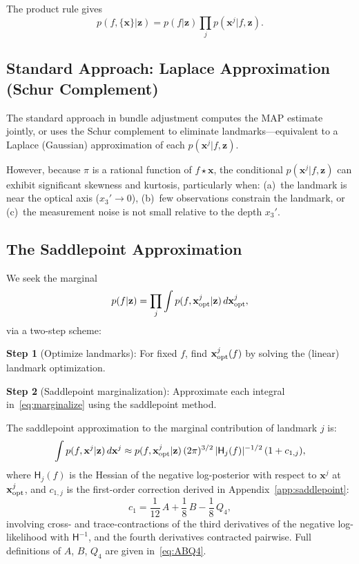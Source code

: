\documentclass[journal]{IEEEtran}
\newcommand{\beq}{\begin{equation}}
\newcommand{\eeq}{\end{equation}}
\begin{document}
The product rule gives
\beq
    p(f, \{\mathbf{x}\} | \mathbf{z}) = 
    p(f | \mathbf{z}) \prod_j p(\mathbf{x}^j | f, \mathbf{z}).
    \label{eq:productrule}
\eeq

\subsection{Standard Approach: Laplace Approximation (Schur Complement)}

The standard approach in bundle adjustment computes 
the MAP estimate jointly, or uses the Schur complement 
to eliminate landmarks---equivalent to a Laplace 
(Gaussian) approximation of each $p(\mathbf{x}^j | f, \mathbf{z})$.

However, because $\pi$ is a rational function of $f \star \mathbf{x}$, 
the conditional $p(\mathbf{x}^j | f, \mathbf{z})$ can exhibit 
significant skewness and kurtosis, particularly when:
(a)~the landmark is near the optical axis ($x_3' \to 0$),
(b)~few observations constrain the landmark, or
(c)~the measurement noise is not small relative to the 
depth $x_3'$.

\subsection{The Saddlepoint Approximation}

We seek the marginal
\beq
    p(f | \mathbf{z}) = \prod_j \int 
    p(f, \mathbf{x}^j_{\rm opt} | \mathbf{z})\, 
    d\mathbf{x}^j_{\rm opt},
    \label{eq:marginalize}
\eeq
via a two-step scheme:

\textbf{Step 1} (Optimize landmarks): For fixed $f$, 
find $\mathbf{x}^j_{\rm opt}(f)$ by solving the 
(linear) landmark optimization.

\textbf{Step 2} (Saddlepoint marginalization): 
Approximate each integral in~\eqref{eq:marginalize} 
using the saddlepoint method.

The saddlepoint approximation to the marginal 
contribution of landmark $j$ is:
\beq
    \int p(f, \mathbf{x}^j | \mathbf{z})\, d\mathbf{x}^j
    \approx 
    p(f, \mathbf{x}^j_{\rm opt} | \mathbf{z})\,
    (2\pi)^{3/2}\, |\mathsf{H}_j(f)|^{-1/2}\,
    (1 + c_{1,j}),
    \label{eq:saddlepoint}
\eeq
where $\mathsf{H}_j(f)$ is the Hessian of the 
negative log-posterior with respect to $\mathbf{x}^j$ 
at $\mathbf{x}^j_{\rm opt}$, and $c_{1,j}$ is the 
first-order correction derived in 
Appendix~\ref{app:saddlepoint}:
\beq
    c_1 = \frac{1}{12}\,A + \frac{1}{8}\,B - \frac{1}{8}\,Q_4,
    \label{eq:saddlebody}
\eeq
involving cross- and trace-contractions of the third 
derivatives of the negative log-likelihood with $\mathsf{H}^{-1}$,
and the fourth derivatives contracted pairwise.
Full definitions of $A$, $B$, $Q_4$ are given 
in~\eqref{eq:ABQ4}.
\end{document}
